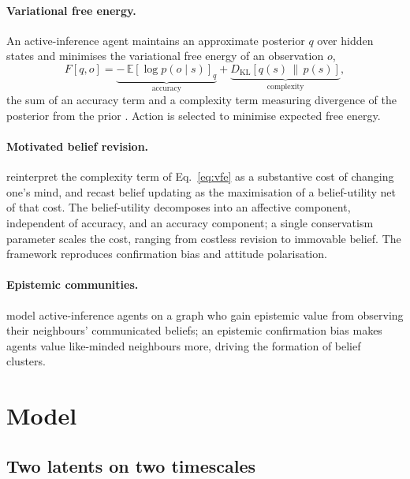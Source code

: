 \documentclass[11pt,a4paper]{article}
\newcommand{\qb}{q}
\newcommand{\KL}[2]{D_{\mathrm{KL}}\!\left[#1\,\|\,#2\right]}
\newcommand{\E}[1]{\mathbb{E}\!\left[#1\right]}
\begin{document}
\paragraph{Variational free energy.}
An active-inference agent maintains an approximate posterior $\qb$ over hidden
states and minimises the variational free energy of an observation $o$,
\begin{equation}
F[\qb,o]=\underbrace{-\,\E{\log p(o\mid s)}_{\qb}}_{\text{accuracy}}
        +\underbrace{\KL{\qb(s)}{p(s)}}_{\text{complexity}},
\label{eq:vfe}
\end{equation}
the sum of an accuracy term and a complexity term measuring divergence of the
posterior from the prior \citep{friston2015ActiveInferenceEpistemic}. Action is
selected to minimise expected free energy.

\paragraph{Motivated belief revision.}
\citet{hylandAlbarracin2025MindChange} reinterpret the complexity term of
Eq.~\eqref{eq:vfe} as a substantive cost of changing one's mind, and recast belief
updating as the maximisation of a belief-utility net of that cost. The
belief-utility decomposes into an affective component, independent of accuracy, and
an accuracy component; a single conservatism parameter scales the cost, ranging
from costless revision to immovable belief. The framework reproduces confirmation
bias and attitude polarisation.

\paragraph{Epistemic communities.}
\citet{albarracin2022EpistemicCommunities} model active-inference agents on a graph
who gain epistemic value from observing their neighbours' communicated beliefs; an
epistemic confirmation bias makes agents value like-minded neighbours more, driving
the formation of belief clusters.

\section{Model}
\label{sec:model}

\subsection{Two latents on two timescales}
\label{ssec:gen}
\end{document}
